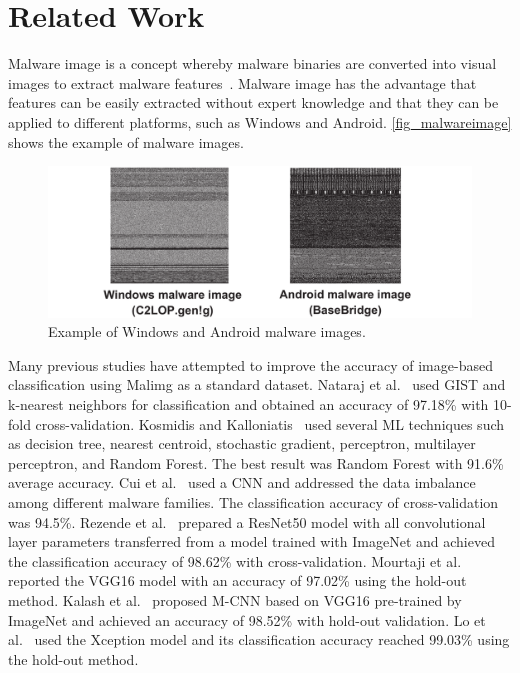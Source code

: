 \documentclass[conference]{IEEEtran}
\begin{document}
\section{Related Work}
\label{sec:related}

Malware image is a concept whereby malware binaries are converted into visual images to extract malware features~\cite{10.1145/2016904.2016908}. Malware image has the advantage that features can be easily extracted without expert knowledge and that they can be applied to different platforms, such as Windows and Android. \autoref{fig_malwareimage} shows the example of malware images.

\begin{figure}[t]
	\centering
	\includegraphics[width=\linewidth,clip]{Malware_image.pdf}
	\caption{Example of Windows and Android malware images.}
	\label{fig_malwareimage}
\end{figure}

Many previous studies have attempted to improve the accuracy of image-based classification using Malimg as a standard dataset.
Nataraj et al.~\cite{10.1145/2016904.2016908} used GIST and k-nearest neighbors for classification and obtained an accuracy of 97.18\% with 10-fold cross-validation.
Kosmidis and Kalloniatis~\cite{10.1145/3139367.3139400} used several ML techniques such as decision tree, nearest centroid, stochastic gradient, perceptron, multilayer perceptron, and Random Forest. The best result was Random Forest with 91.6\% average accuracy.
Cui et al.~\cite{8330042} used a CNN and addressed the data imbalance among different malware families.
The classification accuracy of cross-validation was 94.5\%.
Rezende et al.~\cite{8260773} prepared a ResNet50 model with all convolutional layer parameters transferred from a model trained with ImageNet and achieved the classification accuracy of 98.62\% with cross-validation.
Mourtaji et al.~\cite{10.1145/3320326.3320333} reported the VGG16 model with an accuracy of 97.02\% using the hold-out method.
Kalash et al.~\cite {8328749} proposed M-CNN based on VGG16 pre-trained by ImageNet and achieved an accuracy of 98.52\% with hold-out validation.
Lo et al.~\cite{8763852} used the Xception model and its classification accuracy reached 99.03\% using the hold-out method.
\end{document}
